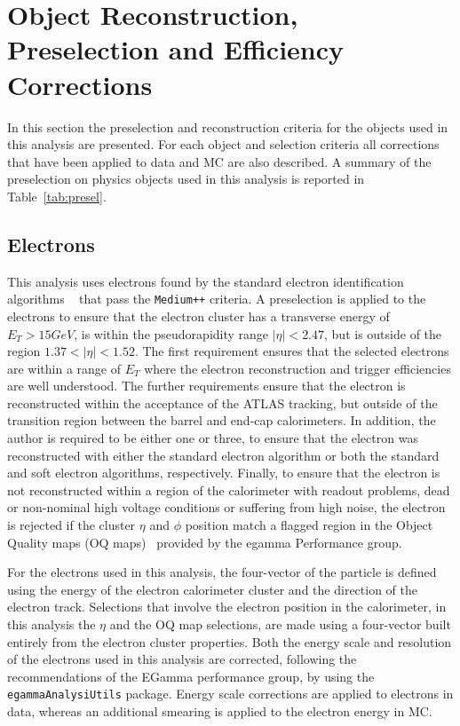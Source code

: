 \section{Object Reconstruction, Preselection and Efficiency Corrections}
\label{sec:presel}

In this section the preselection and reconstruction criteria for the
objects used in this analysis are presented.  For each object and
selection criteria all corrections that have been applied to data and
MC are also described.  A summary of the preselection on physics
objects used in this analysis is reported in Table~\ref{tab:presel}.


\subsection{Electrons}
\label{sec:presel:elec}

This analysis uses electrons found by the standard electron
identification algorithms ~\cite{AtlasCSCBook} that pass the {\tt Medium++}
criteria. A preselection is applied to the electrons to ensure that
the electron cluster has a transverse energy of $E_{T} > 15 GeV$, is
within the pseudorapidity range $|\eta|<2.47$, but is outside of the region
$1.37<|\eta|<1.52$. The first requirement ensures that the selected
electrons are within a range of $E_{T}$ where the electron reconstruction
and trigger efficiencies are well understood. The further requirements
ensure that the electron is reconstructed within the acceptance of
the ATLAS tracking, but outside of the transition region between the
barrel and end-cap calorimeters. 
In addition, the author is required to be either one or three, to ensure that the electron was 
reconstructed with either the standard electron algorithm or both the
standard and soft electron algorithms, respectively.
Finally, to ensure that the electron is not reconstructed within a region of the
calorimeter with readout problems, dead or non-nominal high voltage
conditions or suffering from high noise, the electron is rejected if
the cluster $\eta$ and $\phi$ position match a flagged region in the
Object Quality maps (OQ maps)~\cite{WZcross} provided by the egamma
Performance group.

For the electrons used in this analysis, the four-vector of the
particle is defined using the energy of the electron calorimeter
cluster and the direction of the electron track. Selections that
involve the electron position in the calorimeter, in this analysis the
$\eta$ and the OQ map selections, are made using a four-vector built
entirely from the electron cluster properties. Both the energy scale
and resolution of the electrons used in this analysis are corrected,
following the recommendations of the EGamma performance group, by
using the {\tt egammaAnalysiUtils}
package\cite{EGammaRecomendations}. Energy scale corrections are
applied to electrons in data, whereas an additional smearing is
applied to the electron energy in MC.

